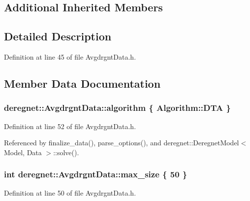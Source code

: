 \subsection*{Additional Inherited Members}


\subsection{Detailed Description}


Definition at line 45 of file Avgdrgnt\+Data.\+h.



\subsection{Member Data Documentation}
\subsubsection[{\texorpdfstring{algorithm}{algorithm}}]{ deregnet\+::\+Avgdrgnt\+Data\+::algorithm \{ Algorithm\+::\+D\+TA \}}\hypertarget{classderegnet_1_1AvgdrgntData_aa75d6acc2d63aa589651c705eaf89280}{}\label{classderegnet_1_1AvgdrgntData_aa75d6acc2d63aa589651c705eaf89280}


Definition at line 52 of file Avgdrgnt\+Data.\+h.



Referenced by finalize\+\_\+data(), parse\+\_\+options(), and deregnet\+::\+Deregnet\+Model$<$ Model, Data $>$\+::solve().

\subsubsection[{\texorpdfstring{max\+\_\+size}{max_size}}]{\setlength{\rightskip}{0pt plus 5cm}int deregnet\+::\+Avgdrgnt\+Data\+::max\+\_\+size \{ 50 \}}\hypertarget{classderegnet_1_1AvgdrgntData_a9e844158e12d5e1c4d519c492cffeb17}{}\label{classderegnet_1_1AvgdrgntData_a9e844158e12d5e1c4d519c492cffeb17}


Definition at line 50 of file Avgdrgnt\+Data.\+h.



